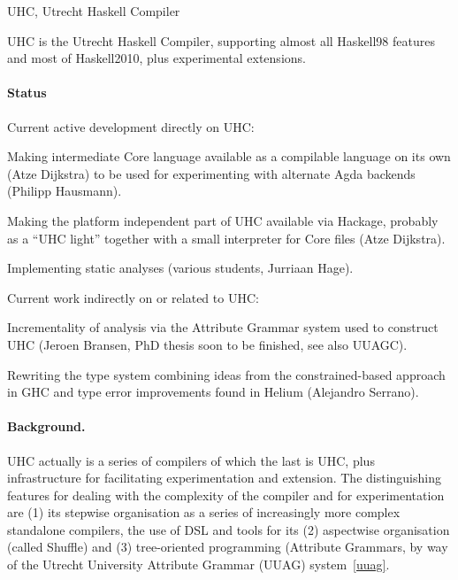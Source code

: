 \begin{hcarentry}[section]{UHC, Utrecht Haskell Compiler}
\label{uhc}
\label{ehc}
\makeheader


UHC is the Utrecht Haskell Compiler, supporting almost all Haskell98 features and most of Haskell2010, plus
experimental extensions.

\paragraph{Status}

Current active development directly on UHC:
\begin{compactitem}
\item Making intermediate Core language available as a compilable language on its own (Atze Dijkstra) to be used for experimenting with alternate Agda backends (Philipp Hausmann).
\item Making the platform independent part of UHC available via Hackage, probably as a ``UHC light'' together with a small interpreter for Core files (Atze Dijkstra).
\item Implementing static analyses (various students, Jurriaan Hage).
\end{compactitem}

Current work indirectly on or related to UHC:
\begin{compactitem}
\item Incrementality of analysis via the Attribute Grammar system used to construct UHC (Jeroen Bransen, PhD thesis soon to be finished, see also UUAGC).
\item Rewriting the type system combining ideas from the constrained-based approach in GHC and type error improvements found in Helium (Alejandro Serrano).
\end{compactitem}

\paragraph{Background.}

UHC actually is a series of compilers of which the last is UHC, plus
infrastructure for facilitating experimentation and extension.
The distinguishing features for dealing with the complexity of the compiler and for experimentation are
(1) its stepwise organisation as a series of increasingly more complex standalone compilers,
the use of DSL and tools for its (2) aspectwise organisation (called Shuffle) and
(3) tree-oriented programming (Attribute Grammars, by way of the
Utrecht University Attribute Grammar (UUAG) system~\cref{uuag}.


\end{hcarentry}
